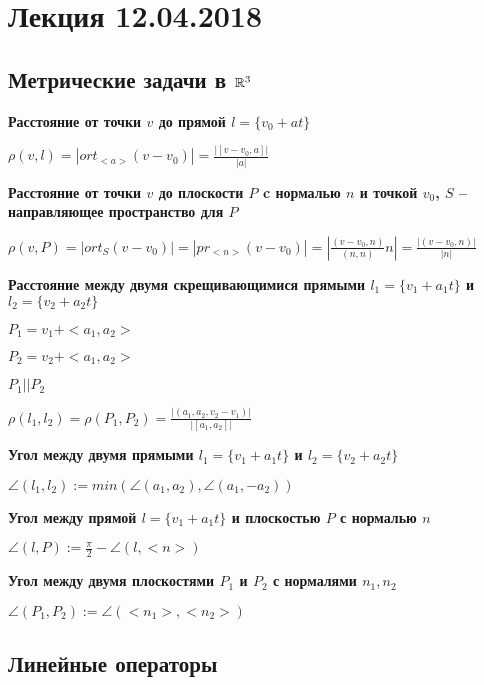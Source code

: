 \section{Лекция 12.04.2018}

\subsection{Метрические задачи в $\mathbb{R}^3$}

\textbf{Расстояние от точки $v$ до прямой $l = \{v_0 + at\}$} 

$\rho(v, l) = |ort_{<a>} (v - v_0)| = \frac{|[v-v_0, a]|}{|a|}$

\vspace{\baselineskip}
\textbf{Расстояние от точки $v$ до плоскости $P$ c нормалью $n$ и точкой $v_0$, $S$ -- направляющее пространство для $P$}

$\rho(v, P) = |ort_S (v-v_0)| = |pr_{<n>} (v-v_0)| = |\frac{(v - v_0, n)}{(n, n)} n| = \frac{|(v - v_0, n)|}{|n|}$

\vspace{\baselineskip}
\textbf{Расстояние между двумя скрещивающимися прямыми $l_1 = \{v_1 + a_1 t\}$ и $l_2 = \{v_2 + a_2 t\}$}

$P_1 = v_1 + <a_1, a_2>$

$P_2 = v_2 + <a_1, a_2>$

$P_1 || P_2$

$\rho (l_1, l_2) = \rho (P_1, P_2) = \frac{|(a_1, a_2, v_2 - v_1)|}{|[a_1, a_2]|}$

\vspace{\baselineskip}
\textbf{Угол между двумя прямыми $l_1 = \{v_1 + a_1 t\}$ и $l_2 = \{v_2 + a_2 t\}$}

$\angle (l_1, l_2):= min( \angle (a_1, a_2), \angle (a_1, -a_2))$

\vspace{\baselineskip}
\textbf{Угол между прямой $l = \{v_1 + a_1 t\}$ и плоскостью  $P$ с нормалью $n$}

$\angle (l, P) := \frac{\pi}{2} - \angle (l, <n>)$

\vspace{\baselineskip}
\textbf{Угол между двумя плоскостями $P_1$ и $P_2$ с нормалями $n_1, n_2$}

$\angle (P_1, P_2) := \angle (<n_1>, <n_2>)$

\subsection{Линейные операторы}

